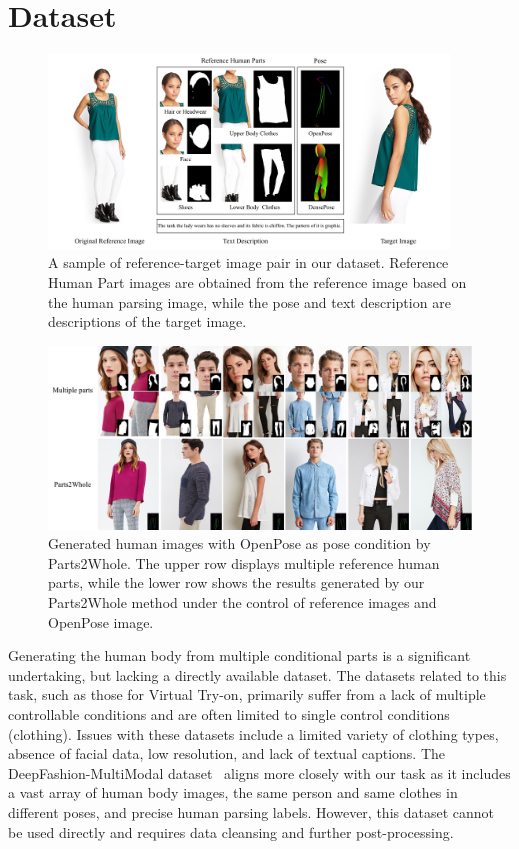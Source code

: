 
\section{Dataset}


\begin{figure}[t]
    \centering
    \includegraphics[width=0.95\textwidth]{figure/supp_data_sample.pdf}
    \caption{A sample of reference-target image pair in our dataset. Reference Human Part images are obtained from the reference image based on the human parsing image, while the pose and text description are descriptions of the target image.}
    \label{fig:sample_data}
\end{figure}

\begin{figure}[ht!]
    \centering
    \includegraphics[width=\textwidth]{figure/supp_openpose.pdf}
    \caption{Generated human images with OpenPose as pose condition by Parts2Whole. The upper row displays multiple reference human parts, while the lower row shows the results generated by our Parts2Whole method under the control of reference images and OpenPose image.}
    \label{fig:supp_openpose}
\end{figure}

Generating the human body from multiple conditional parts is a significant undertaking, but lacking a directly available dataset. The datasets related to this task, such as those for Virtual Try-on\cite{choi2021viton,morelli2022dress,zablotskaia2019dwnet}, primarily suffer from a lack of multiple controllable conditions and are often limited to single control conditions (clothing). Issues with these datasets include a limited variety of clothing types, absence of facial data, low resolution, and lack of textual captions. The DeepFashion-MultiModal dataset~\cite{jiang2022text2human,liuLQWTcvpr16DeepFashion} aligns more closely with our task as it includes a vast array of human body images, the same person and same clothes in different poses, and precise human parsing labels. However, this dataset cannot be used directly and requires data cleansing and further post-processing.

